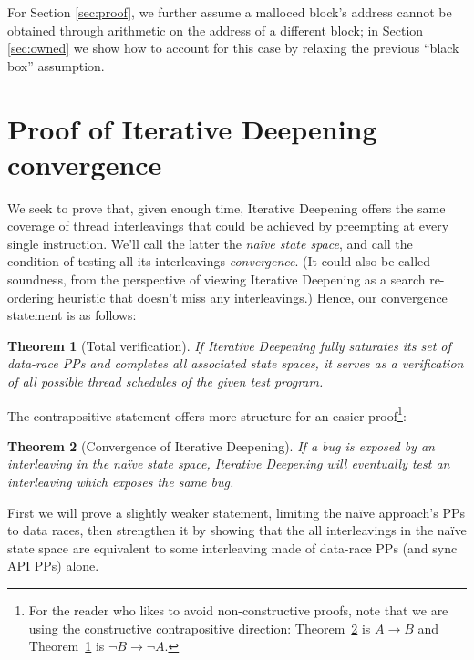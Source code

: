 \documentclass[pldi]{sigplanconf-pldi15}
\newtheorem{theorem}{Theorem}
\begin{document}
For Section \ref{sec:proof}, we further assume a malloced block's address cannot be obtained through arithmetic on the address of a different block; in Section \ref{sec:owned} we show how to account for this case by relaxing the previous ``black box'' assumption.


\section{Proof of Iterative Deepening convergence}

We seek to prove that, given enough time, Iterative Deepening offers the same coverage of thread interleavings that could be achieved by preempting at every single instruction.
We'll call the latter the {\em na\"{i}ve state space}, and call the condition of testing all its interleavings {\em convergence}.
(It could also be called soundness, from the perspective of viewing Iterative Deepening as a search re-ordering heuristic that doesn't miss any interleavings.)
Hence, our convergence statement is as follows:

\begin{theorem}[Total verification]
	If Iterative Deepening fully saturates its set of data-race PPs and completes all associated state spaces,
	it serves as a verification of all possible thread schedules of the given test program.
	\label{thm:totalverif}
\end{theorem}

The contrapositive statement offers more structure for an easier proof\footnote{
For the reader who likes to avoid non-constructive proofs, %
note that we are using the constructive contrapositive direction:
Theorem~\ref{thm:convergence} is $A \rightarrow B$ and Theorem~\ref{thm:totalverif} is $\neg B \rightarrow \neg A$.}:

\begin{theorem}[Convergence of Iterative Deepening]
	If a bug is exposed by an interleaving in the na\"{i}ve state space, Iterative Deepening will eventually test an interleaving which exposes the same bug.
	\label{thm:convergence}
\end{theorem}

First we will prove a slightly weaker statement, limiting the na\"{i}ve approach's PPs to data races,
then strengthen it by showing that the all interleavings in the na\"{i}ve state space
are equivalent to some interleaving made of data-race PPs (and sync API PPs) alone.
\end{document}
